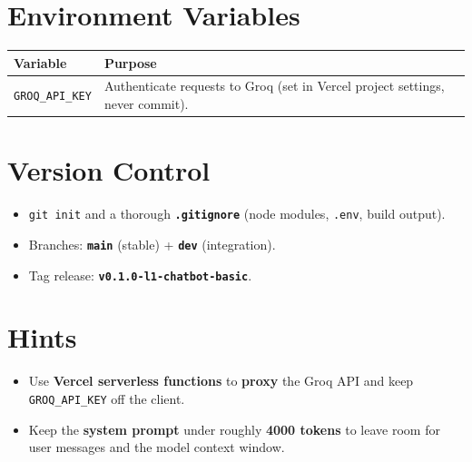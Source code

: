 \documentclass{article}
\begin{document}
\section{Environment Variables}

\begin{tabular}{@{}lp{8cm}@{}}
\toprule
\textbf{Variable} & \textbf{Purpose} \\
\midrule
\texttt{GROQ\_API\_KEY} & Authenticate requests to Groq (set in Vercel project settings, never commit). \\
\bottomrule
\end{tabular}

\section{Version Control}

\begin{itemize}[leftmargin=*]
  \item \texttt{git init} and a thorough \textbf{\texttt{.gitignore}} (node modules, \texttt{.env}, build output).
  \item Branches: \textbf{\texttt{main}} (stable) + \textbf{\texttt{dev}} (integration).
  \item Tag release: \textbf{\texttt{v0.1.0-l1-chatbot-basic}}.
\end{itemize}

\section{Hints}

\begin{itemize}[leftmargin=*]
  \item Use \textbf{Vercel serverless functions} to \textbf{proxy} the Groq API and keep \texttt{GROQ\_API\_KEY} off the client.
  \item Keep the \textbf{system prompt} under roughly \textbf{4000 tokens} to leave room for user messages and the model context window.
\end{itemize}
\end{document}
